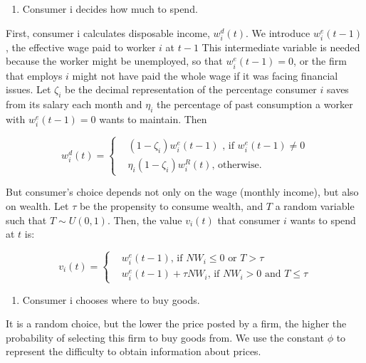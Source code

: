 \documentclass[11pt,]{article}
\providecommand{\tightlist}{%
\setlength{\itemsep}{0pt}\setlength{\parskip}{0pt}}
\begin{document}
\begin{enumerate}
\def\labelenumi{\alph{enumi}.}
\tightlist
\item
  Consumer i decides how much to spend.
\end{enumerate}

First, consumer i calculates disposable income, \(w_i^d(t)\). We
introduce \(w_i^{e}(t-1)\), the effective wage paid to worker \(i\) at
\(t-1\) This intermediate variable is needed because the worker might be
unemployed, so that \(w_i^{e}(t-1) = 0\), or the firm that employs \(i\)
might not have paid the whole wage if it was facing financial issues.
Let \(\zeta_i\) be the decimal representation of the percentage consumer
\(i\) saves from its salary each month and \(\eta_i\) the percentage of
past consumption a worker with \(w_i^{e}(t-1) = 0\) wants to maintain.
Then

\begin{equation}
w_i^d(t) = \begin{cases}
& (1 - \zeta_i)w_i^{e}(t-1) \text{ , if } w_i^{e}(t-1) \neq 0 \\
& \eta_i (1 - \zeta_i)w_i^{R}(t) \text{, otherwise. }
\end{cases}
\end{equation}

But consumer's choice depends not only on the wage (monthly income), but
also on wealth. Let \(\tau\) be the propensity to consume wealth, and
\(T\) a random variable such that \(T \sim U(0,1)\). Then, the value
\(v_i(t)\) that consumer \(i\) wants to spend at \(t\) is:

\begin{equation}
v_i(t) = \begin{cases}
& w_i^{e}(t-1) \text{, if } NW_i \leq 0 \text{ or } T > \tau  \\
& w_i^{e}(t-1) + \tau NW_i \text{, if } NW_i > 0 \text{ and } T \leq \tau 
\end{cases}
\end{equation}

\begin{enumerate}
\def\labelenumi{\alph{enumi}.}
\setcounter{enumi}{1}
\tightlist
\item
  Consumer i chooses where to buy goods.
\end{enumerate}

It is a random choice, but the lower the price posted by a firm, the
higher the probability of selecting this firm to buy goods from. We use
the constant \(\phi\) to represent the difficulty to obtain information
about prices.
\end{document}
